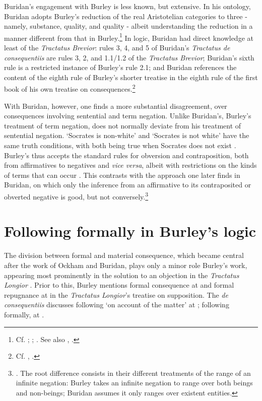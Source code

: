 \documentclass[]{birkjour}
\begin{document}
Buridan's engagement with Burley is less known, but extensive. In his ontology, Buridan adopts Burley's reduction of the real Aristotelian categories to three - namely, substance, quality, and quality - albeit understanding the reduction in a manner different from that in Burley.\footnote{Cf. \autocite[pp. 57-59, 204, 269-270]{Klima2009}; \autocite[p. 13]{Read2016b}; \autocite{DutilhNovaes2013}. See also \autocite[p. 439]{Michael1985b}, \autocite{Markowski1982}.} In logic, Buridan had direct knowledge at least of the \textit{Tractatus Brevior}: rules 3, 4, and 5 of Buridan's \textit{Tractatus de consequentiis} are rules 3, 2, and 1.1/1.2 of the \textit{Tractatus Brevior}; Buridan's sixth rule is a restricted instance of Burley's rule 2.1; and Buridan references the content of the eighth rule of Burley's shorter treatise in the eighth rule of the first book of his own treatise on consequences.\footnote{Cf. \autocite[p. 212.29-31]{BurleyDPAL}, \autocite[I. 8]{BuridanTC}.}

With Buridan, however, one finds a more substantial disagreement, over consequences involving sentential and term negation. Unlike Buridan's, Burley's treatment of term negation, does not normally deviate from his treatment of sentential negation. `Socrates is non-white' and `Socrates is not white' have the same truth conditions, with both being true when Socrates does not exist \autocite[pp. 57.17-58.12; 215.6-21; 216.15-18]{BurleyDPAL}. Burley's thus accepts the standard rules for obversion and contraposition, both from affirmatives to negatives and \textit{vice versa}, albeit with restrictions on the kinds of terms that can occur \autocite[pp. 129-131, par. 73-81]{Green-Pedersen1980b}. This contrasts with the approach one later finds in Buridan, on which only the inference from an affirmative to its contraposited or obverted negative is good, but not conversely.\footnote{\autocite[p. 85]{Buridan2015}. The root difference consists in their different treatments of the range of an infinite negation: Burley takes an infinite negation to range over both beings and non-beings; Buridan assumes it only ranges over existent entities.}
\section{Following formally in Burley's logic}
The division between formal and material consequence, which became central after the work of Ockham and Buridan, plays only a minor role Burley's work, appearing most prominently in the solution to an objection in the \textit{Tractatus Longior} \autocite[p. 80.13-29, 84.8-86.21]{BurleyDPAL}. Prior to this, Burley mentions formal consequence at \autocite[p. 25.21]{BurleyDPAL} and formal repugnance at \autocite[p. 39.20]{BurleyDPAL} in the \textit{Tractatus Longior}'s treatise on supposition. The \textit{de consequentiis} discusses following `on account of the matter' at \autocite[pp. 128-129, par. 70; 162-163, par. 168]{Green-Pedersen1980b}; following formally, at \autocite[pp. 130, par. 75; 132, par. 84-85; 137, par. 106; 143, par. 118; 163, par. 168]{Green-Pedersen1980b}. 
\end{document}
